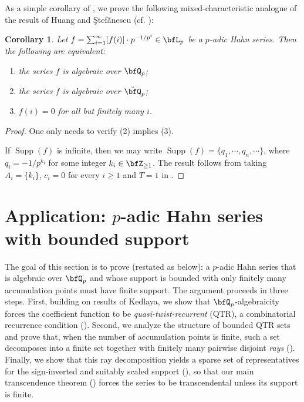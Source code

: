 \documentclass[english,oneside]{smfart}
\newcommand{\opn}[1]{\operatorname{#1}}
\newtheorem{corollary}[theorem]{Corollary}
\begin{document}
As a simple corollary of , we prove the following mixed-characteristic analogue of the result of Huang and Ştefănescu (cf. ):
\begin{corollary}\label{thm:39174}
    Let $f=\sum_{i=1}^\infty [f(i)]\cdot p^{-1/p^i}\in\bfL_p$ be a $p$-adic Hahn series. Then the following are equivalent:
    \begin{enumerate}
        \item the series $f$ is algebraic over $\bfQ_p$;
        \item the series $f$ is algebraic over $\breve{\bfQ}_p$;
        \item $f(i)=0$ for all but finitely many $i$.
    \end{enumerate}
\end{corollary}
\begin{proof}
        One only needs to verify (2) implies (3).

    If $\opn{Supp}(f)$ is infinite, then we may write $\opn{Supp}(f)=\{q_1,\cdots,q_n,\cdots\}$, where $q_i=-1/p^{k_i}$ for some integer $k_i\in\bfZ_{\geq 1}$. The result follows from taking $A_i=\{k_i\}$, $c_i=0$ for every $i \geq 1$ and $T=1$ in .
\end{proof}
\fi
\section{Application: $p$-adic Hahn series with bounded support}\label{sec:55224}
The goal of this section is to prove  (restated as  below): a $p$-adic Hahn series that is algebraic over $\bfQ_p$ and whose support is bounded with only finitely many accumulation points must have finite support. The argument proceeds in three steps. First, building on results of Kedlaya, we show that $\bfQ_p$-algebraicity forces the coefficient function to be \emph{quasi-twist-recurrent} (QTR), a combinatorial recurrence condition (). Second, we analyze the structure of bounded QTR sets and prove that, when the number of accumulation points is finite, such a set decomposes into a finite set together with finitely many pairwise disjoint \emph{rays} (). Finally, we show that this ray decomposition yields a sparse set of representatives for the sign-inverted and suitably scaled support (), so that our main transcendence theorem () forces the series to be transcendental unless its support is finite.
\end{document}
